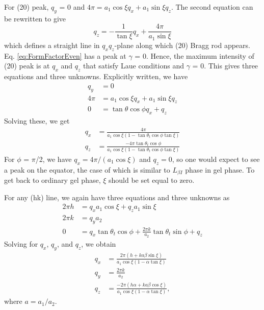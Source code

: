 \documentclass[12pt]{article}
\begin{document}
For (20) peak, $q_y$ = 0 and $4\pi=a_1\cos\xi q_x+a_1\sin\xi q_z$. The second equation can be rewritten to give
\begin{equation}
	q_z=-\frac{1}{\tan\xi}q_x+\frac{4\pi}{a_1\sin\xi}
\end{equation}
which defines a straight line in $q_xq_z$-plane along which (20) Bragg rod appears. Eq. \ref{eq:FormFactorEven} has a peak at $\gamma$ = 0. Hence, the maximum intensity of (20) peak is at $q_x$ and $q_z$ that satisfy Laue conditions and $\gamma$ = 0. This gives three equations and three unknowns. Explicitly written, we have
\begin{align}
	q_y &= 0\\
	4\pi &= a_1\cos\xi q_x+a_1\sin\xi q_z\\
	0 &= \tan\theta\cos\phi q_x+q_z
\end{align}
Solving these, we get
\begin{align}%
	q_x &= \frac{4\pi}{a_1\cos\xi(1-\tan\theta_t\cos\phi\tan\xi)}\\
	q_z &= \frac{-4\pi\tan\theta_t\cos\phi}{a_1\cos\xi(1-\tan\theta_t\cos\phi\tan\xi)}
\end{align}
For $\phi$ = $\pi$/2, we have $q_x=4\pi/(a_1\cos\xi)$ and $q_z=0$, so one would expect to see a peak on the equator, the case of which is similar to $L_{\beta I}$ phase in gel phase. To get back to ordinary gel phase, $\xi$ should be set equal to zero.

For any (hk) line, we again have three equations and three unknowns as
\begin{align}
	2\pi h &= q_xa_1\cos\xi +q_za_1\sin\xi\\
	2\pi k &= q_ya_2\\
	0 &= q_x\tan\theta_t\cos\phi + \frac{2\pi k}{a_2}\tan\theta_t\sin\phi +q_z
\end{align}
Solving for $q_x$, $q_y$, and $q_z$, we obtain
\begin{align}
	q_x &= \frac{2\pi(h+ka\beta\sin\xi)}{a_1\cos\xi(1-\alpha\tan\xi)}\\
	q_y &= \frac{2\pi k}{a_2}\\
	q_z &= \frac{-2\pi(h\alpha+ka\beta\cos\xi)}{a_1\cos\xi(1-\alpha\tan\xi)},
\end{align}
where $a=a_1/a_2$.
\end{document}

